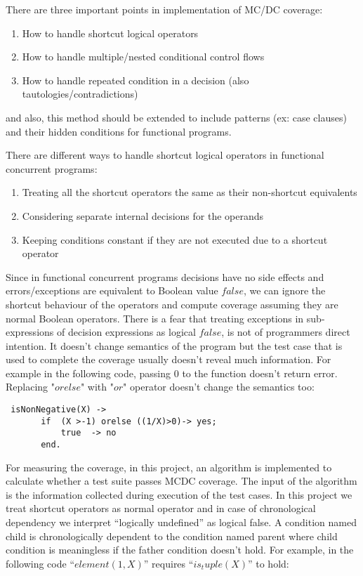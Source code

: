 \documentclass[12pt,a4paper]{report}
\begin{document}
There are three important points in implementation of MC/DC coverage:

\begin{enumerate}
 \item How to handle shortcut logical operators
 \item How to handle multiple/nested conditional control flows
 \item How to handle repeated condition in a decision (also tautologies/contradictions)
\end{enumerate}
 
and also, this method should be extended to include patterns (ex: case clauses) and their hidden conditions for functional programs.

There are different ways to handle shortcut logical operators in functional concurrent programs:

\begin{enumerate}
 \item Treating all the shortcut operators the same as their non-shortcut equivalents
 \item Considering separate internal decisions for the operands\cite{DO-248B} 
 \item Keeping conditions constant if they are not executed due to a shortcut operator\cite{chilenski1994applicability}
\end{enumerate}
 
Since in functional concurrent programs decisions have no side effects and errors/exceptions are equivalent to Boolean value $false$, we can ignore the
 shortcut behaviour of the operators and compute coverage assuming they are normal Boolean operators. There is a fear that treating exceptions in
 sub-expressions of decision expressions as logical $false$, is not of programmers direct intention. It doesn’t change semantics of the program but
 the test case that is used to complete the coverage usually doesn’t reveal much information. For example in the following code, passing $0$ to the
 function doesn’t return error. Replacing "$orelse$" with "$or$" operator doesn’t change the semantics too:

\begin{lstlisting}
 isNonNegative(X) -> 
       if  (X >-1) orelse ((1/X)>0)-> yes;
           true  -> no
       end.
\end{lstlisting} 
 
For measuring the coverage, in this project, an algorithm is implemented to calculate whether a test suite passes MCDC coverage. The input of the algorithm
 is the information collected during execution of the test cases. In this project we treat shortcut operators as normal operator and in case of
 chronological dependency we interpret “logically undefined” as logical false. A condition named child is chronologically dependent to the condition named
 parent where child condition is meaningless if the father condition doesn’t hold. For example, in the following code “$element(1,X)$” requires
 “$is_tuple(X)$” to hold:
\end{document}
